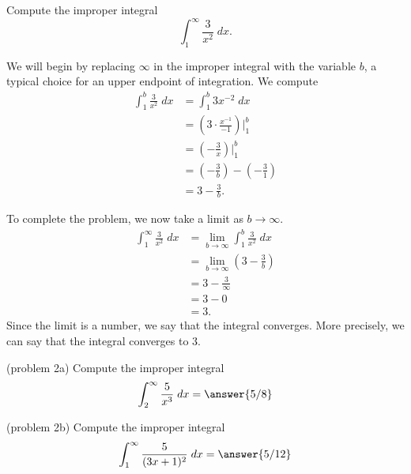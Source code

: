 \documentclass[handout]{ximera}
\begin{document}
\begin{example}[example 2]
Compute the improper integral
\[
\int_1^\infty \frac{3}{x^2} \; dx.
\]

We will begin by replacing $\infty$ in the improper integral with the variable $b$, a typical choice for an upper endpoint of integration.
We compute
\begin{align*}
\int_1^b \frac{3}{x^2} \; dx &= \int_1^b 3x^{-2} \; dx\\
                           &= \left(3\cdot \frac{x^{-1}}{-1} \right) \bigg|_1^b\\
                           &= \left(-\frac{3}{x} \right) \bigg|_1^b\\
                       &= \left(-\frac{3}{b} \right) - \left(-\frac{3}{1} \right)\\
                       &=3 - \frac{3}{b}.
\end{align*}
                       
To complete the problem, we now take a limit as $b \to \infty$.
\begin{align*}
\int_1^\infty \frac{3}{x^2} \; dx &= \lim_{b \to \infty}\int_1^b \frac{3}{x^2} \; dx\\
                       &=\lim_{b \to \infty} \left(3 - \frac{3}{b}\right)\\
                       &= 3 -\frac{3}{\infty}\\
                       &= 3 - 0 \\
                       &= 3.
\end{align*}
Since the limit is a number, we say that the integral converges.
More precisely, we can say that the integral converges to $3$.

\end{example}



\begin{problem}(problem 2a)
Compute the improper integral
\[
\int_2^\infty \frac{5}{x^3} \; dx = \answer{5/8} 
\]
\begin{multipleChoice}
\end{multipleChoice}
\end{problem}


\begin{problem}(problem 2b)
Compute the improper integral
\[
\int_1^\infty \frac{5}{(3x+1)^2} \; dx = \answer{5/12}
\]
\begin{multipleChoice}
\end{multipleChoice}
\end{problem}
\end{document}
